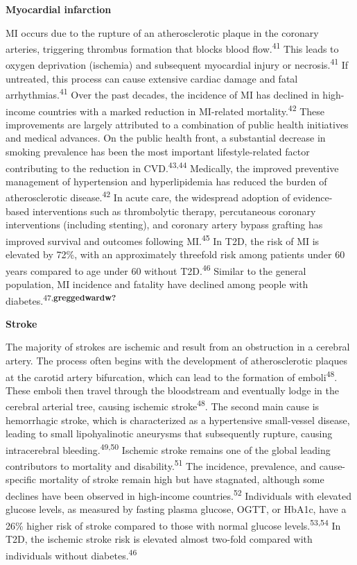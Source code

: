 \documentclass[
  letterpaper,
  headsepline=true,
  open=any]{scrbook}
\begin{document}
\textbf{Myocardial infarction}

MI occurs due to the rupture of an atherosclerotic plaque in the
coronary arteries, triggering thrombus formation that blocks blood
flow.\textsuperscript{41} This leads to oxygen deprivation (ischemia)
and subsequent myocardial injury or necrosis.\textsuperscript{41} If
untreated, this process can cause extensive cardiac damage and fatal
arrhythmias.\textsuperscript{41} Over the past decades, the incidence of
MI has declined in high-income countries with a marked reduction in
MI-related mortality.\textsuperscript{42} These improvements are largely
attributed to a combination of public health initiatives and medical
advances. On the public health front, a substantial decrease in smoking
prevalence has been the most important lifestyle-related factor
contributing to the reduction in CVD.\textsuperscript{43,44} Medically,
the improved preventive management of hypertension and hyperlipidemia
has reduced the burden of atherosclerotic disease.\textsuperscript{42}
In acute care, the widespread adoption of evidence-based interventions
such as thrombolytic therapy, percutaneous coronary interventions
(including stenting), and coronary artery bypass grafting has improved
survival and outcomes following MI.\textsuperscript{45} In T2D, the risk
of MI is elevated by 72\%, with an approximately threefold risk among
patients under 60 years compared to age under 60 without
T2D.\textsuperscript{46} Similar to the general population, MI incidence
and fatality have declined among people with
diabetes.\textsuperscript{47,\textbf{greggedwardw?}}

\textbf{Stroke}

The majority of strokes are ischemic and result from an obstruction in a
cerebral artery. The process often begins with the development of
atherosclerotic plaques at the carotid artery bifurcation, which can
lead to the formation of emboli\textsuperscript{48}. These emboli then
travel through the bloodstream and eventually lodge in the cerebral
arterial tree, causing ischemic stroke\textsuperscript{48}. The second
main cause is hemorrhagic stroke, which is characterized as a
hypertensive small-vessel disease, leading to small lipohyalinotic
aneurysms that subsequently rupture, causing intracerebral
bleeding.\textsuperscript{49,50} Ischemic stroke remains one of the
global leading contributors to mortality and
disability.\textsuperscript{51} The incidence, prevalence, and
cause-specific mortality of stroke remain high but have stagnated,
although some declines have been observed in high-income
countries.\textsuperscript{52} Individuals with elevated glucose levels,
as measured by fasting plasma glucose, OGTT, or HbA1c, have a 26\%
higher risk of stroke compared to those with normal glucose
levels.\textsuperscript{53,54} In T2D, the ischemic stroke risk is
elevated almost two-fold compared with individuals without
diabetes.\textsuperscript{46}
\end{document}
